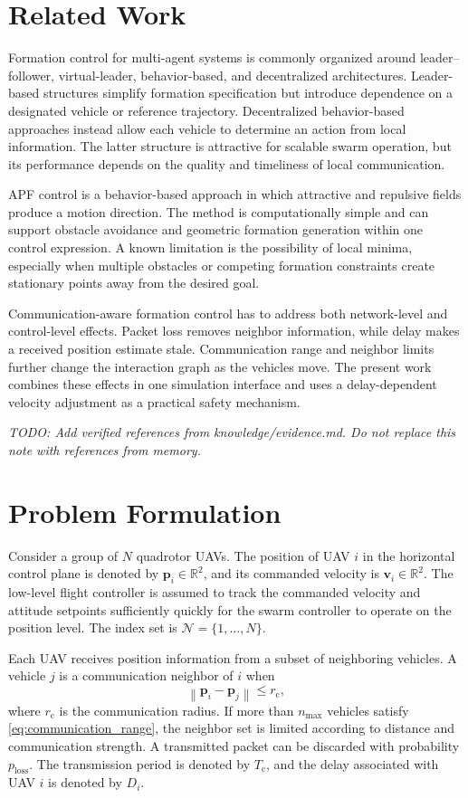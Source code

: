 \documentclass[journal]{IEEEtran}
\newcommand{\bp}{\bm{p}}
\newcommand{\bv}{\bm{v}}
\newcommand{\norm}[1]{\left\lVert#1\right\rVert}
\begin{document}
\section{Related Work}
\label{sec:related}
Formation control for multi-agent systems is commonly organized around leader--follower, virtual-leader, behavior-based, and decentralized architectures. Leader-based structures simplify formation specification but introduce dependence on a designated vehicle or reference trajectory. Decentralized behavior-based approaches instead allow each vehicle to determine an action from local information. The latter structure is attractive for scalable swarm operation, but its performance depends on the quality and timeliness of local communication.

APF control is a behavior-based approach in which attractive and repulsive fields produce a motion direction. The method is computationally simple and can support obstacle avoidance and geometric formation generation within one control expression. A known limitation is the possibility of local minima, especially when multiple obstacles or competing formation constraints create stationary points away from the desired goal.

Communication-aware formation control has to address both network-level and control-level effects. Packet loss removes neighbor information, while delay makes a received position estimate stale. Communication range and neighbor limits further change the interaction graph as the vehicles move. The present work combines these effects in one simulation interface and uses a delay-dependent velocity adjustment as a practical safety mechanism.

\textit{TODO: Add verified references from knowledge/evidence.md. Do not replace this note with references from memory.}

\section{Problem Formulation}
\label{sec:problem}
Consider a group of $N$ quadrotor UAVs. The position of UAV $i$ in the horizontal control plane is denoted by $\bp_i \in \mathbb{R}^{2}$, and its commanded velocity is $\bv_i \in \mathbb{R}^{2}$. The low-level flight controller is assumed to track the commanded velocity and attitude setpoints sufficiently quickly for the swarm controller to operate on the position level. The index set is $\mathcal{N}=\{1,\ldots,N\}$.

Each UAV receives position information from a subset of neighboring vehicles. A vehicle $j$ is a communication neighbor of $i$ when
\begin{equation}
    \norm{\bp_i-\bp_j} \leq r_{\mathrm{c}},
    \label{eq:communication_range}
\end{equation}
where $r_{\mathrm{c}}$ is the communication radius. If more than $n_{\max}$ vehicles satisfy \eqref{eq:communication_range}, the neighbor set is limited according to distance and communication strength. A transmitted packet can be discarded with probability $p_{\mathrm{loss}}$. The transmission period is denoted by $T_{\mathrm{c}}$, and the delay associated with UAV $i$ is denoted by $D_i$.
\end{document}
